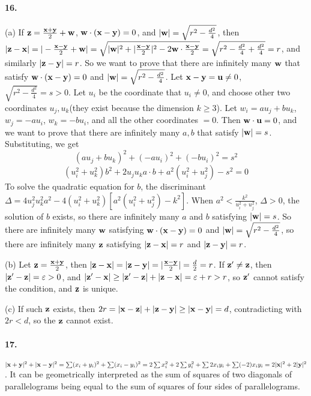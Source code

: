 \documentclass[a4paper]{article}
\begin{document}
\paragraph{16.}
(a) If $\mathbf{z}=\frac{\mathbf{x}+\mathbf{y}}{2}+\mathbf{w}$, $\mathbf{w}\cdot(\mathbf{x}-\mathbf{y})=0$, and $|\mathbf{w}|=\sqrt{r^2-\frac{d^2}{4}}$, then $|\mathbf{z}-\mathbf{x}|=|-\frac{\mathbf{x}-\mathbf{y}}{2}+\mathbf{w}|=\sqrt{|\mathbf{w}|^2+|\frac{\mathbf{x}-\mathbf{y}}{2}|^2-2\mathbf{w}\cdot\frac{\mathbf{x}-\mathbf{y}}{2}}=\sqrt{r^2-\frac{d^2}{4}+\frac{d^2}{4}}=r$, and similarly $|\mathbf{z}-\mathbf{y}|=r$. So we want to prove that there are infinitely many $\mathbf{w}$ that satisfy $\mathbf{w}\cdot(\mathbf{x}-\mathbf{y})=0$ and $|\mathbf{w}|=\sqrt{r^2-\frac{d^2}{4}}$. Let $\mathbf{x}-\mathbf{y}=\mathbf{u}\neq0$, $\sqrt{r^2-\frac{d^2}{4}}=s>0$. Let $u_i$ be the coordinate that $u_i\neq0$, and choose other two coordinates $u_j, u_k$(they exist because the dimension $k\geq3$). Let $w_i=au_j+bu_k$, $w_j=-au_i$, $w_k=-bu_i$, and all the other coordinates $=0$. Then $\mathbf{w}\cdot\mathbf{u}=0$, and we want to prove that there are infinitely many $a,b$ that satisfy $|\mathbf{w}|=s$. Substituting, we get \[(au_j+bu_k)^2+(-au_i)^2+(-bu_i)^2=s^2\]
\[(u_i^2+u_k^2)b^2+2u_ju_ka\cdot b+a^2(u_i^2+u_j^2)-s^2=0\]
To solve the quadratic equation for $b$, the discriminant  $\Delta=4u_j^2u_k^2a^2-4(u_i^2+u_k^2)\left[a^2(u_i^2+u_j^2)-k^2 \right]$. When $a^2<\frac{k^2}{u_i^2+u_j^2}$, $\Delta>0$, the solution of $b$ exists, so there are infinitely many $a$ and $b$ satisfying $|\mathbf{w}|=s$. So there are infinitely many $\mathbf{w}$ satisfying $\mathbf{w}\cdot(\mathbf{x}-\mathbf{y})=0$ and $|\mathbf{w}|=\sqrt{r^2-\frac{d^2}{4}}$, so there are infinitely many $\mathbf{z}$ satisfying $|\mathbf{z}-\mathbf{x}|=r$ and $|\mathbf{z}-\mathbf{y}|=r$.
\medskip

(b) Let $\mathbf{z}=\frac{\mathbf{x}+\mathbf{y}}{2}$, then $|\mathbf{z}-\mathbf{x}|=|\mathbf{z}-\mathbf{y}|=|\frac{\mathbf{x}-\mathbf{y}}{2}|=\frac{d}{2}=r$. If $\mathbf{z}'\neq \mathbf{z}$, then $|\mathbf{z}'-\mathbf{z}|=\varepsilon>0$, and $|\mathbf{z}'-\mathbf{x}|\geq|\mathbf{z}'-\mathbf{z}|+|\mathbf{z}-\mathbf{x}|=\varepsilon+r>r$, so $\mathbf{z}'$ cannot satisfy the condition, and $\mathbf{z}$ is unique.
\medskip

(c) If such $\mathbf{z}$ exists, then $2r=|\mathbf{x}-\mathbf{z}|+|\mathbf{z}-\mathbf{y}|\geq|\mathbf{x}-\mathbf{y}|=d$, contradicting with $2r<d$, so the $\mathbf{z}$ cannot exist.

\paragraph{17.}
$|\mathbf{x}+\mathbf{y}|^2+|\mathbf{x}-\mathbf{y}|^2=\sum(x_i+y_i)^2+\sum(x_i-y_i)^2=2\sum x_i^2+2\sum y_i^2+\sum 2x_iy_i+\sum(-2)x_iy_i=2|\mathbf{x}|^2+2|\mathbf{y}|^2$. It can be geometrically interpreted as the sum of squares of two diagonals of parallelograms being equal to the sum of squares of four sides of parallelograms.
\end{document}
